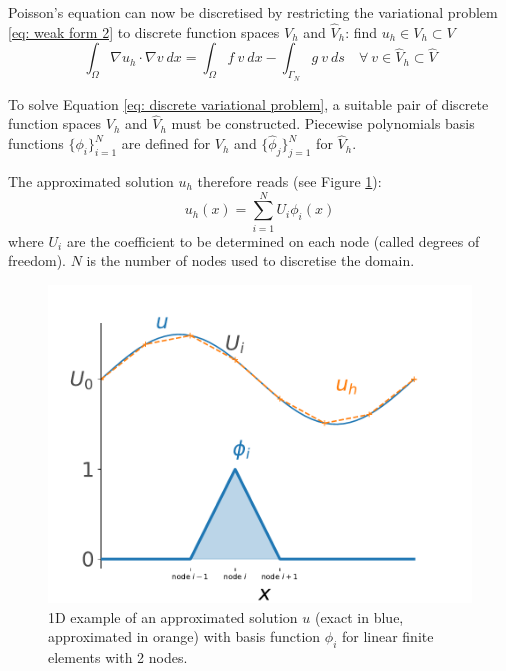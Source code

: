 Poisson's equation can now be discretised by restricting the variational problem \ref{eq: weak form 2} to discrete function spaces $V_h$ and $\hat{V}_h$: find $u_h \in V_h \subset V$
\begin{equation}
    \int_{\Omega} \nabla u_h \cdot \nabla v  \ dx = \int_{\Omega} f \ v \ dx - \int_{\Gamma_N} g \ v \ ds \quad \forall \ v \in \hat{V}_h \subset \hat{V}
    \label{eq: discrete variational problem}
\end{equation}

To solve Equation \ref{eq: discrete variational problem}, a suitable pair of discrete function spaces $V_h$ and $\hat{V}_h$ must be constructed.
Piecewise polynomials basis functions $\{ \phi_i \}_{i=1}^N$ are defined for $V_h$ and $\{ \hat{\phi}_j \}_{j=1}^N$ for $\hat{V}_h$.

The approximated solution $u_h$ therefore reads (see Figure \ref{fig: example approximated solution}):
\begin{equation}
    u_h(x) = \sum^N_{i=1}U_i \phi_i(x)
    \label{eq: FEM solution}
\end{equation}
where $U_i$ are the coefficient to be determined on each node (called degrees of freedom).
$N$ is the number of nodes used to discretise the domain.

\begin{figure}
    \centering
    \includegraphics[width=\linewidth]{Figures/Chapter2/approximated_solution.pdf}
    \caption{1D example of an approximated solution $u$ (exact in blue, approximated in orange) with basis function $\phi_i$ for linear finite elements with 2 nodes.}
    \label{fig: example approximated solution}
\end{figure}

